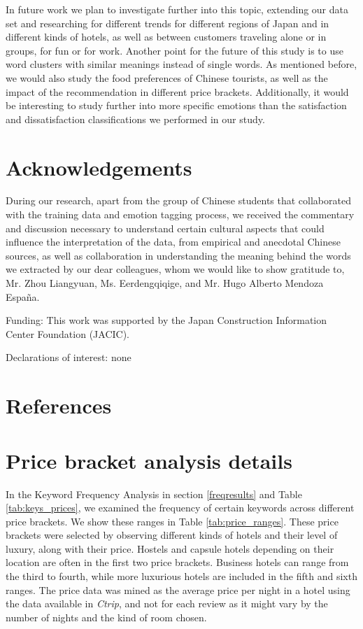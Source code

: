 \documentclass[review]{elsarticle}
\begin{document}
In future work we plan to investigate further into this topic, extending our data set and researching for different trends for different regions of Japan and in different kinds of hotels, as well as between customers traveling alone or in groups, for fun or for work. Another point for the future of this study is to use word clusters with similar meanings instead of single words. As mentioned before, we would also study the food preferences of Chinese tourists, as well as the impact of the recommendation in different price brackets. Additionally, it would be interesting to study further into more specific emotions than the satisfaction and dissatisfaction classifications we performed in our study.

\section*{Acknowledgements}

During our research, apart from the group of Chinese students that collaborated with the training data and emotion tagging process, we received the commentary and discussion necessary to understand certain
cultural aspects that could influence the interpretation of the data, from empirical and anecdotal Chinese sources, as well as collaboration in understanding the meaning behind the words we extracted by our dear colleagues, whom we would like to show gratitude to, Mr. Zhou Liangyuan, Ms. Eerdengqiqige, and Mr. Hugo Alberto Mendoza España.

\medskip

Funding: This work was supported by the Japan Construction Information Center Foundation (JACIC).

\medskip

Declarations of interest: none

\clearpage
\section*{References}



\clearpage

\appendixpage
\appendix

\section{Price bracket analysis details}\label{appendix:price_ranges}

In the Keyword Frequency Analysis in section \ref{freqresults} and Table \ref{tab:keys_prices}, we examined the frequency of certain keywords across different price brackets. We show these ranges in Table \ref{tab:price_ranges}. These price brackets were selected by observing different kinds of hotels and their level of luxury, along with their price. Hostels and capsule hotels depending on their location are often in the first two price brackets. Business hotels can range from the third to fourth, while more luxurious hotels are included in the fifth and sixth ranges. The price data was mined as the average price per night in a hotel using the data available in \textit{Ctrip}, and not for each review as it might vary by the number of nights and the kind of room chosen.
\end{document}
